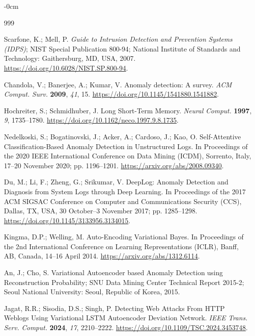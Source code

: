 \documentclass[futureinternet,article,submit,moreauthors]{Definitions/mdpi}
\begin{document}
\begin{adjustwidth}{-\extralength}{0cm}
\begin{thebibliography}{999}

Scarfone, K.; Mell, P. \emph{Guide to Intrusion Detection and Prevention Systems (IDPS)}; NIST Special Publication 800-94; National Institute of Standards and Technology: Gaithersburg, MD, USA, 2007. \url{https://doi.org/10.6028/NIST.SP.800-94}.

Chandola, V.; Banerjee, A.; Kumar, V. Anomaly detection: A survey. \emph{ACM Comput. Surv.} \textbf{2009}, \emph{41}, 15. \url{https://doi.org/10.1145/1541880.1541882}.

Hochreiter, S.; Schmidhuber, J. Long Short-Term Memory. \emph{Neural Comput.} \textbf{1997}, \emph{9}, 1735--1780. \url{https://doi.org/10.1162/neco.1997.9.8.1735}.

Nedelkoski, S.; Bogatinovski, J.; Acker, A.; Cardoso, J.; Kao, O. Self-Attentive Classification-Based Anomaly Detection in Unstructured Logs. In Proceedings of the 2020 IEEE International Conference on Data Mining (ICDM), Sorrento, Italy, 17--20 November 2020; pp. 1196--1201. \url{https://arxiv.org/abs/2008.09340}.

Du, M.; Li, F.; Zheng, G.; Srikumar, V. DeepLog: Anomaly Detection and Diagnosis from System Logs through Deep Learning. In Proceedings of the 2017 ACM SIGSAC Conference on Computer and Communications Security (CCS), Dallas, TX, USA, 30 October--3 November 2017; pp. 1285--1298. \url{https://doi.org/10.1145/3133956.3134015}.

Kingma, D.P.; Welling, M. Auto-Encoding Variational Bayes. In Proceedings of the 2nd International Conference on Learning Representations (ICLR), Banff, AB, Canada, 14--16 April 2014. \url{https://arxiv.org/abs/1312.6114}.

An, J.; Cho, S. Variational Autoencoder based Anomaly Detection using Reconstruction Probability; SNU Data Mining Center Technical Report 2015-2; Seoul National University: Seoul, Republic of Korea, 2015.

Jagat, R.R.; Sisodia, D.S.; Singh, P. Detecting Web Attacks From HTTP Weblogs Using Variational LSTM Autoencoder Deviation Network. \emph{IEEE Trans. Serv. Comput.} \textbf{2024}, \emph{17}, 2210--2222. \url{https://doi.org/10.1109/TSC.2024.3453748}.


\end{thebibliography}
\end{adjustwidth}
\end{document}
